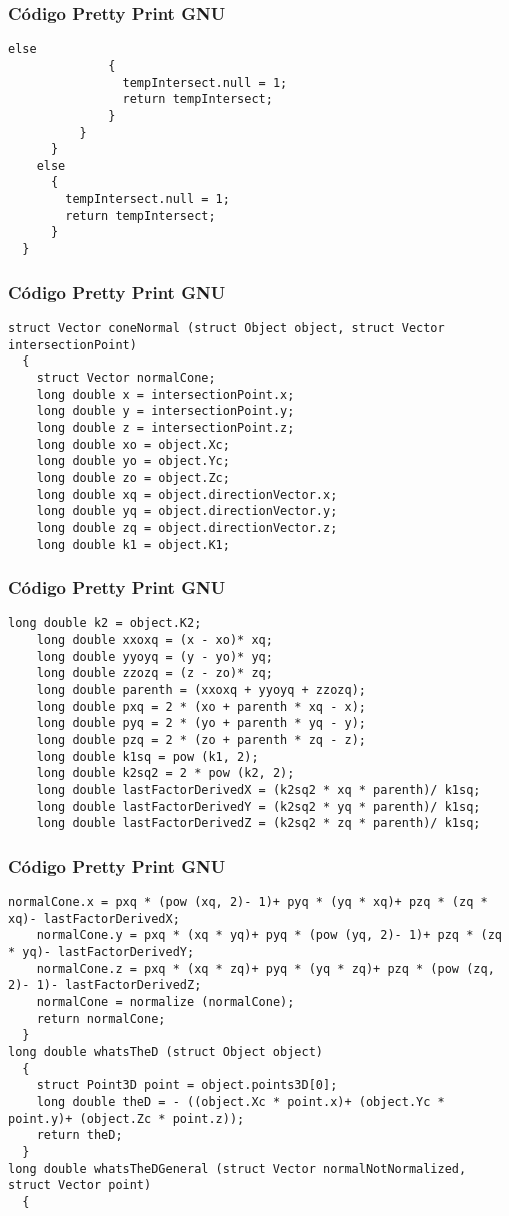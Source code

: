 \documentclass{beamer}
\begin{document}
\begin{frame}[fragile]
\frametitle{C\'odigo Pretty Print GNU}
\begin{lstlisting}[style=CStyle]
            else
              {
                tempIntersect.null = 1;
                return tempIntersect;
              }
          }
      }
    else
      {
        tempIntersect.null = 1;
        return tempIntersect;
      }
  }
\end{lstlisting}
\end{frame}
\begin{frame}[fragile]
\frametitle{C\'odigo Pretty Print GNU}
\begin{lstlisting}[style=CStyle]
struct Vector coneNormal (struct Object object, struct Vector intersectionPoint)
  {
    struct Vector normalCone;
    long double x = intersectionPoint.x;
    long double y = intersectionPoint.y;
    long double z = intersectionPoint.z;
    long double xo = object.Xc;
    long double yo = object.Yc;
    long double zo = object.Zc;
    long double xq = object.directionVector.x;
    long double yq = object.directionVector.y;
    long double zq = object.directionVector.z;
    long double k1 = object.K1;
\end{lstlisting}
\end{frame}
\begin{frame}[fragile]
\frametitle{C\'odigo Pretty Print GNU}
\begin{lstlisting}[style=CStyle]
    long double k2 = object.K2;
    long double xxoxq = (x - xo)* xq;
    long double yyoyq = (y - yo)* yq;
    long double zzozq = (z - zo)* zq;
    long double parenth = (xxoxq + yyoyq + zzozq);
    long double pxq = 2 * (xo + parenth * xq - x);
    long double pyq = 2 * (yo + parenth * yq - y);
    long double pzq = 2 * (zo + parenth * zq - z);
    long double k1sq = pow (k1, 2);
    long double k2sq2 = 2 * pow (k2, 2);
    long double lastFactorDerivedX = (k2sq2 * xq * parenth)/ k1sq;
    long double lastFactorDerivedY = (k2sq2 * yq * parenth)/ k1sq;
    long double lastFactorDerivedZ = (k2sq2 * zq * parenth)/ k1sq;
\end{lstlisting}
\end{frame}
\begin{frame}[fragile]
\frametitle{C\'odigo Pretty Print GNU}
\begin{lstlisting}[style=CStyle]
    normalCone.x = pxq * (pow (xq, 2)- 1)+ pyq * (yq * xq)+ pzq * (zq * xq)- lastFactorDerivedX;
    normalCone.y = pxq * (xq * yq)+ pyq * (pow (yq, 2)- 1)+ pzq * (zq * yq)- lastFactorDerivedY;
    normalCone.z = pxq * (xq * zq)+ pyq * (yq * zq)+ pzq * (pow (zq, 2)- 1)- lastFactorDerivedZ;
    normalCone = normalize (normalCone);
    return normalCone;
  }
long double whatsTheD (struct Object object)
  {
    struct Point3D point = object.points3D[0];
    long double theD = - ((object.Xc * point.x)+ (object.Yc * point.y)+ (object.Zc * point.z));
    return theD;
  }
long double whatsTheDGeneral (struct Vector normalNotNormalized, struct Vector point)
  {
    \end{lstlisting}
\end{frame}
\end{document}
